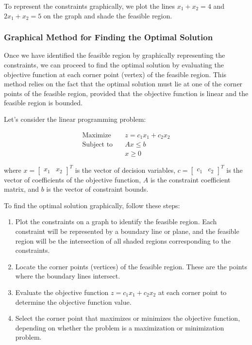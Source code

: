\documentclass[12pt]{book} %
\begin{document}
To represent the constraints graphically, we plot the lines \( x_1 + x_2 = 4 \) and \( 2x_1 + x_2 = 5 \) on the graph and shade the feasible region.

\subsubsection{Graphical Method for Finding the Optimal Solution}
Once we have identified the feasible region by graphically representing the constraints, we can proceed to find the optimal solution by evaluating the objective function at each corner point (vertex) of the feasible region. This method relies on the fact that the optimal solution must lie at one of the corner points of the feasible region, provided that the objective function is linear and the feasible region is bounded.

Let's consider the linear programming problem:

\[
\begin{aligned}
\text{Maximize} \quad & z = c_1 x_1 + c_2 x_2 \\
\text{Subject to} \quad & Ax \leq b \\
& x \geq 0
\end{aligned}
\]

where \( x = \begin{bmatrix} x_1 & x_2 \end{bmatrix}^T \) is the vector of decision variables, \( c = \begin{bmatrix} c_1 & c_2 \end{bmatrix}^T \) is the vector of coefficients of the objective function, \( A \) is the constraint coefficient matrix, and \( b \) is the vector of constraint bounds.

To find the optimal solution graphically, follow these steps:

\begin{enumerate}
    \item Plot the constraints on a graph to identify the feasible region. Each constraint will be represented by a boundary line or plane, and the feasible region will be the intersection of all shaded regions corresponding to the constraints.
    
    \item Locate the corner points (vertices) of the feasible region. These are the points where the boundary lines intersect.
    
    \item Evaluate the objective function \( z = c_1 x_1 + c_2 x_2 \) at each corner point to determine the objective function value.
    
    \item Select the corner point that maximizes or minimizes the objective function, depending on whether the problem is a maximization or minimization problem.
\end{enumerate}
\end{document}
